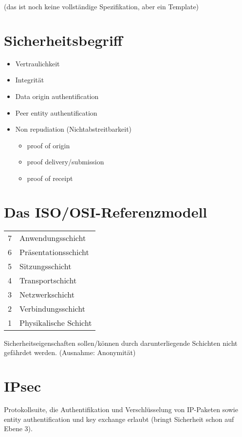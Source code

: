 \documentclass[a4paper,twoside,DIV15,BCOR12mm]{scrbook}
\begin{document}
(das ist noch keine vollständige Spezifikation, aber ein \glqq Template\grqq)

\section{Sicherheitsbegriff}

\begin{itemize}
	\item Vertraulichkeit
	\item Integrität
	\item Data origin authentification
	\item Peer entity authentification
	\item Non repudiation (Nichtabstreitbarkeit)
		\begin{itemize}
			\item proof of origin
			\item proof delivery/submission
			\item proof of receipt
		\end{itemize}
\end{itemize}

\section{Das ISO/OSI-Referenzmodell}

\begin{tabular}{ll}
7 & Anwendungsschicht\\
6 & Präsentationsschicht\\
5 & Sitzungsschicht\\
4 & Transportschicht\\
3 & Netzwerkschicht\\
2 & Verbindungsschicht\\
1 & Physikalische Schicht
\end{tabular}

Sicherheitseigenschaften sollen/können durch darunterliegende Schichten nicht gefährdet werden. (Ausnahme: Anonymität)

\section{IPsec}

Protokollsuite, die Authentifikation und Verschlüsselung von IP-Paketen sowie entity authentification und key exchange erlaubt (bringt Sicherheit schon auf Ebene 3).\\
\end{document}
